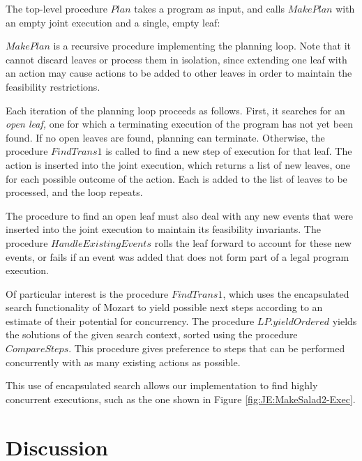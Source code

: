 The top-level procedure $Plan$ takes a program as input, and calls
$MakePlan$ with an empty joint execution and a single, empty leaf:


$MakePlan$ is a recursive procedure implementing the planning loop.
Note that it cannot discard leaves or process them in isolation, since
extending one leaf with an action may cause actions to be added to
other leaves in order to maintain the feasibility restrictions.


Each iteration of the planning loop proceeds as follows. First, it
searches for an \emph{open leaf,} one for which a terminating execution
of the program has not yet been found. If no open leaves are found,
planning can terminate. Otherwise, the procedure $FindTrans1$ is
called to find a new step of execution for that leaf. The action is
inserted into the joint execution, which returns a list of new leaves,
one for each possible outcome of the action. Each is added to the
list of leaves to be processed, and the loop repeats.

The procedure to find an open leaf must also deal with any new events
that were inserted into the joint execution to maintain its feasibility
invariants. The procedure $HandleExistingEvents$ rolls the leaf forward
to account for these new events, or fails if an event was added that
does not form part of a legal program execution.


Of particular interest is the procedure $FindTrans1$, which uses
the encapsulated search functionality of Mozart to yield possible
next steps according to an estimate of their potential for concurrency.
The procedure $LP.yieldOrdered$ yields the solutions of the given
search context, sorted using the procedure $CompareSteps$. This procedure
gives preference to steps that can be performed concurrently with
as many existing actions as possible.


This use of encapsulated search allows our implementation to find
highly concurrent executions, such as the one shown in Figure \ref{fig:JE:MakeSalad2-Exec}.

\newpage{}

\section{Discussion\label{sec:JointExec:Discussion}}

